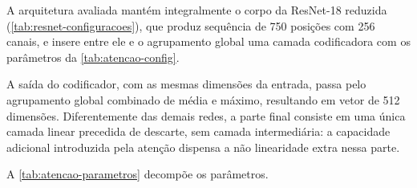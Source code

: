 A arquitetura avaliada mantém integralmente o corpo da ResNet-18 reduzida
(\autoref{tab:resnet-configuracoes}), que produz sequência de 750 posições
com 256 canais, e insere entre ele e o agrupamento global uma camada
codificadora com os parâmetros da \autoref{tab:atencao-config}.

\begin{table}[h!]
	\captionsetup{width=12cm}
\end{table}

A saída do codificador, com as mesmas dimensões da entrada, passa pelo
agrupamento global combinado de média e máximo, resultando em vetor de 512
dimensões. Diferentemente das demais redes, a parte final consiste em uma
única camada linear precedida de descarte, sem camada intermediária: a
capacidade adicional introduzida pela atenção dispensa a não linearidade
extra nessa parte.

A \autoref{tab:atencao-parametros} decompõe os parâmetros.

\begin{table}[h!]
	\captionsetup{width=12.5cm}
\end{table}

